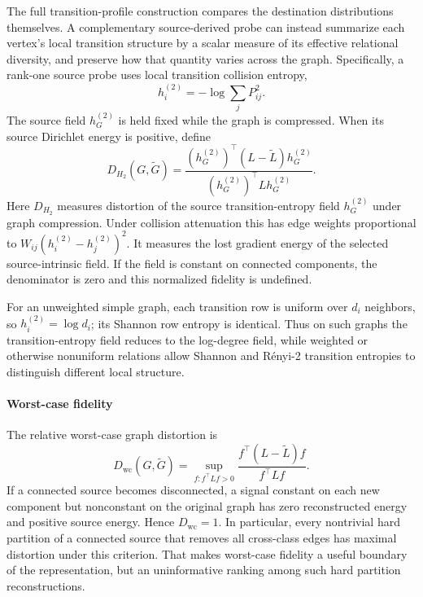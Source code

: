 The full transition-profile construction compares the destination distributions themselves.
A complementary source-derived probe can instead summarize each vertex's local transition structure by a scalar measure of its effective relational diversity, and preserve how that quantity varies across the graph.
Specifically, a rank-one source probe uses local transition collision entropy,
\begin{equation}
h_i^{(2)}=-\log\sum_jP_{ij}^2.
\end{equation}
The source field $h_G^{(2)}$ is held fixed while the graph is compressed.
When its source Dirichlet energy is positive, define
\begin{equation}
D_{H_2}(G,\widetilde G)
=\frac{(h_G^{(2)})^\top(L-\widetilde L)h_G^{(2)}}
{(h_G^{(2)})^\top Lh_G^{(2)}}.
\label{eq:entropy-probe-distortion}
\end{equation}
Here $D_{H_2}$ measures distortion of the source transition-entropy field $h_G^{(2)}$ under graph compression.
Under collision attenuation this has edge weights proportional to $W_{ij}(h_i^{(2)}-h_j^{(2)})^2$.
It measures the lost gradient energy of the selected source-intrinsic field.
If the field is constant on connected components, the denominator is zero and this normalized fidelity is undefined.

For an unweighted simple graph, each transition row is uniform over $d_i$ neighbors, so $h_i^{(2)}=\log d_i$; its Shannon row entropy is identical.
Thus on such graphs the transition-entropy field reduces to the log-degree field, while weighted or otherwise nonuniform relations allow Shannon and R\'enyi-2 transition entropies to distinguish different local structure.

\paragraph{Worst-case fidelity}
The relative worst-case graph distortion is
\begin{equation}
D_{\mathrm{wc}}(G,\widetilde G)
=\sup_{f:f^\top Lf>0}
\frac{f^\top(L-\widetilde L)f}{f^\top Lf}.
\label{eq:graph-worst-case-spectral-distortion}
\end{equation}
If a connected source becomes disconnected, a signal constant on each new component but nonconstant on the original graph has zero reconstructed energy and positive source energy.
Hence $D_{\mathrm{wc}}=1$.
In particular, every nontrivial hard partition of a connected source that removes all cross-class edges has maximal distortion under this criterion.
That makes worst-case fidelity a useful boundary of the representation, but an uninformative ranking among such hard partition reconstructions.

